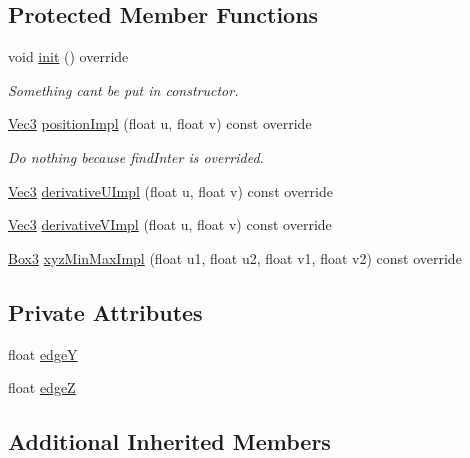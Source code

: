 \subsection*{Protected Member Functions}
\begin{DoxyCompactItemize}
\item 
void \hyperlink{classSquareYZ_a1d82d4fea479dd58096d723eb9109cfe}{init} () override
\begin{DoxyCompactList}\small\item\em Something can\textquotesingle{}t be put in constructor. \end{DoxyCompactList}\item 
\hyperlink{vec_8h_ae4fcaa7c0a3935930ed1be5f70b90373}{Vec3} \hyperlink{classSquareYZ_a56695f7f1cbd288bf93918deac0feb4c}{position\+Impl} (float u, float v) const override
\begin{DoxyCompactList}\small\item\em Do nothing because find\+Inter is overrided. \end{DoxyCompactList}\item 
\hyperlink{vec_8h_ae4fcaa7c0a3935930ed1be5f70b90373}{Vec3} \hyperlink{classSquareYZ_a2b37c54c61d5f2896657f8510884e64e}{derivative\+U\+Impl} (float u, float v) const override
\item 
\hyperlink{vec_8h_ae4fcaa7c0a3935930ed1be5f70b90373}{Vec3} \hyperlink{classSquareYZ_a6fc7a2189bf889b0dd99c229d2a6d0da}{derivative\+V\+Impl} (float u, float v) const override
\item 
\hyperlink{structBox3}{Box3} \hyperlink{classSquareYZ_a61260b3bae72f9354a8fe4c145bce87d}{xyz\+Min\+Max\+Impl} (float u1, float u2, float v1, float v2) const override
\end{DoxyCompactItemize}
\subsection*{Private Attributes}
\begin{DoxyCompactItemize}
\item 
float \hyperlink{classSquareYZ_a6d7f81cfc7814c9d3f948b0115606254}{edgeY}
\item 
float \hyperlink{classSquareYZ_a87fc6f3c129ce52756296f2cbf402bc6}{edgeZ}
\end{DoxyCompactItemize}
\subsection*{Additional Inherited Members}


